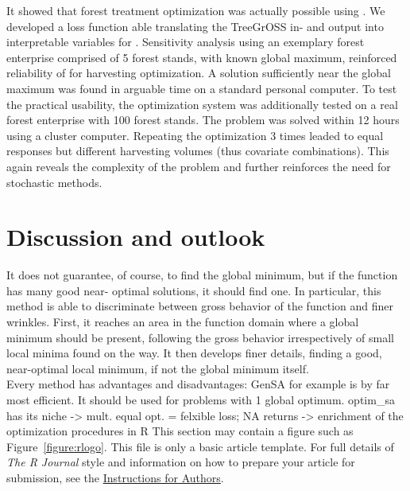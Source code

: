 It showed that forest treatment optimization was actually possible using . We developed a loss function able translating the TreeGrOSS in- and output into interpretable variables for . Sensitivity analysis using an exemplary forest enterprise comprised of 5 forest stands, with known global maximum, reinforced reliability of  for harvesting optimization. A solution sufficiently near the global maximum was found in arguable time on a standard personal computer. To test the practical usability, the optimization system was additionally tested on a real forest enterprise with 100 forest stands. The problem was solved within 12 hours using a cluster computer. Repeating the optimization 3 times leaded to equal responses but different harvesting volumes (thus covariate combinations). This again reveals the complexity of the problem and further reinforces the need for stochastic methods.

\section{Discussion and outlook}
It does not guarantee, of course, to find the global minimum, but if the function has many good near- optimal solutions, it should find one. In particular, this method is able to discriminate between gross behavior of the function and finer wrinkles. First, it reaches an area in the function domain where a global minimum should be present, following the gross behavior irrespectively of small local minima found on the way. It then develops finer details, finding a good, near-optimal local minimum, if not the global minimum itself.\\

Every method has advantages and disadvantages: GenSA for example is by far most efficient. It should be used for problems with 1 global optimum. optim\_sa has its niche -> mult. equal opt. = felxible loss; NA returns
-> enrichment of the optimization procedures in R  
This section may contain a figure such as Figure~\ref{figure:rlogo}.
This file is only a basic article template. For full details of \emph{The R Journal} style and information on how to prepare your article for submission, see the \href{http://journal.r-project.org/share/author-guide.pdf}{Instructions for Authors}.



\address{Author One\\
  Affiliation\\
  Address\\
  Country\\}

\address{Author Two\\
  Affiliation\\
  Address\\
  Country\\}

\address{Author Three\\
  Affiliation\\
  Address\\
  Country\\}
